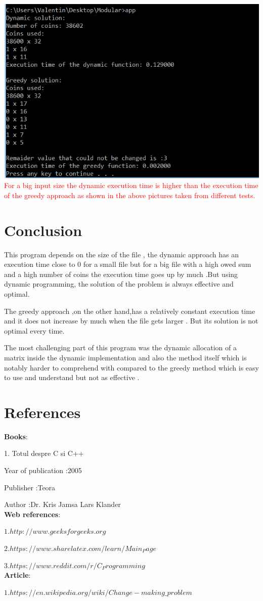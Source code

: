 \documentclass[12]{article}
\begin{document}
\includegraphics[scale=0.6]{gcc-5.png}\\


\textcolor{red}{For a big input size the dynamic execution time is higher than the execution time of the greedy approach as shown in the above pictures taken from different tests.}



\newpage
\section{Conclusion}
\textbf{}

This program depends on the size of the file , the dynamic approach has an execution time close to 0 for a small file but for a big file with a high owed sum and a high number of coins the execution time goes up by much .But using dynamic programming, the solution of the problem is always effective and optimal.

The greedy approach ,on the other hand,has a relatively constant execution time and it does not increase by much when the file gets larger . But its solution is not optimal every time.

The most challenging part of this program was the dynamic allocation of a matrix inside the dynamic implementation and also the method itself which is notably harder to comprehend with compared to the greedy method which is easy to use and understand but not as effective .


\newpage
\section{References}

\textbf{Books}:

1. Totul despre C si C++ 

Year of publication  :2005

Publisher :Teora

Author :Dr. Kris Jamsa Lars Klander\\
\textbf{Web references}:

$1.http://www.geeksforgeeks.org$

$2.https://www.sharelatex.com/learn/Main_Page$

$3.https://www.reddit.com/r/C_Programming$
\\
\textbf{Article}:

$1.https://en.wikipedia.org/wiki/Change-making\_problem$
\end{document}
